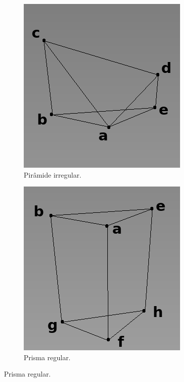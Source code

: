 \begin{figure}[H]
    \centering
    \caption{Poliedro separado em dois volumes.}
    \begin{subfigure}[t]{0.3\textwidth}
        \includegraphics[width=\textwidth]{dados/figuras/pyramid_line3.png}
        \caption{Pirâmide irregular.}
        \label{fig:pyramid_i}
    \end{subfigure}
    \hspace{2em}
    \begin{subfigure}[t]{0.3\textwidth}
        \includegraphics[width=\textwidth]{dados/figuras/prism_line2.png}
        \caption{Prisma regular.}
        \label{fig:prism_i}
    \end{subfigure}
\end{figure}

